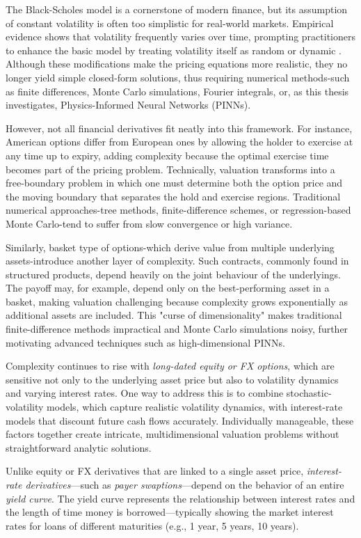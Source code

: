 \documentclass[12pt]{report} %
\theoremstyle{plain} %
\theoremstyle{definition} %
\theoremstyle{remark} %
\begin{document}
The Black-Scholes model is a cornerstone of modern finance, but its assumption of constant
volatility is often too simplistic for real-world markets. Empirical evidence shows that volatility
frequently varies over time, prompting practitioners to enhance the basic model by treating
volatility itself as random or dynamic \cite{hestonmodel}. Although these modifications make the
pricing equations more realistic, they no longer yield simple closed-form solutions, thus
requiring numerical methods-such as finite differences, Monte Carlo simulations, Fourier
integrals, or, as this thesis investigates, Physics-Informed Neural Networks (PINNs).

However, not all financial derivatives fit neatly into this framework. For instance, American
options differ from European ones by allowing the holder to exercise at any time up to expiry,
adding complexity because the optimal exercise time becomes part of the pricing problem.
Technically, valuation transforms into a free-boundary problem in which one must determine both the
option price and the moving boundary that separates the hold and exercise regions. Traditional
numerical approaches-tree methods, finite-difference schemes, or regression-based Monte
Carlo-tend to suffer from slow convergence or high variance.

Similarly, basket type of options-which derive value from multiple underlying assets-introduce another
layer of complexity. Such contracts, commonly found in structured products, depend heavily on the
joint behaviour of the underlyings. The payoff may, for example, depend only on the
best-performing asset in a basket, making valuation challenging because complexity grows
exponentially as additional assets are included. This "curse of dimensionality" makes traditional
finite-difference methods impractical and Monte Carlo simulations noisy, further motivating
advanced techniques such as high-dimensional PINNs.

Complexity continues to rise with \emph{long-dated equity or FX options}, which are sensitive not
only to the underlying asset price but also to volatility dynamics and varying interest rates. One
way to address this is to combine stochastic-volatility models, which capture realistic volatility
dynamics, with interest-rate models that discount future cash flows accurately. Individually
manageable, these factors together create intricate, multidimensional valuation problems without
straightforward analytic solutions.

Unlike equity or FX derivatives that are linked to a single asset price, 
\emph{interest-rate derivatives}—such as \emph{payer swaptions}—depend on the behavior of an 
entire \emph{yield curve}. The yield curve represents the relationship between interest rates 
and the length of time money is borrowed—typically showing the market interest rates for loans 
of different maturities (e.g., 1 year, 5 years, 10 years). 
\end{document}
